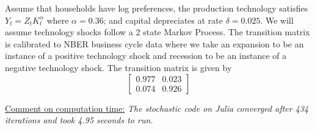 \documentclass{article} %
\theoremstyle{definition}
\begin{document}
	Assume that households have log preferences, the production technology satisfies $Y_t = Z_tK_t^\alpha$ where $\alpha = 0.36$; and capital depreciates at rate $\delta = 0.025$. We will
	assume technology shocks follow a 2 state Markov Process. The transition matrix is calibrated to NBER business cycle data where we take an expansion to be an instance of a positive technology shock and recession to be an instance of a negative technology shock. The transition matrix is given by
	\[\begin{bmatrix}
		0.977 & 0.023 \\0.074 & 0.926
	\end{bmatrix}\]

\underline{Comment on computation time:} \textit{The stochastic code on Julia converged after 434 iterations and took 4.95 seconds to run.}
\end{document}
